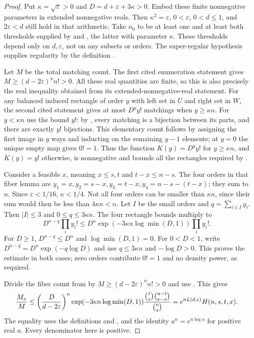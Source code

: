 \begin{proof}
Put $\kappa=\sqrt\varepsilon>0$ and $D=d+\varepsilon+3\kappa>0$.
Embed these finite nonnegative parameters in extended nonnegative reals.
Then $\kappa^2=\varepsilon$, $0<\varepsilon$, $0<d\le1$, and
$2\varepsilon<d$ still hold in that arithmetic.
Take $n_0$ to be at least one and at least both thresholds supplied by
 and
, the latter with parameter
$\kappa$. These thresholds depend only on $d,\varepsilon$, not on any
subsets or orders. The super-regular hypothesis supplies regularity by
the definition .

Let $M$ be the total matching count. The first cited enumeration statement
gives $M\ge(d-2\varepsilon)^n n!>0$. All these real quantities are finite,
so this is also precisely the real inequality obtained from its
extended-nonnegative-real statement. For any balanced induced rectangle
of order $y$ with left set in $U$ and right set in $W$, the second cited
statement gives at most $D^y y!$ matchings when $y\ge\kappa n$.
For $y<\kappa n$ use the bound $y!$: by
, every matching is a bijection between its
parts, and there are exactly $y!$ bijections. This elementary count
follows by assigning the first image in $y$ ways and inducting on the
remaining $y-1$ elements; at $y=0$ the unique empty map gives $0!=1$.
Thus the function $K(y)=D^y y!$ for $y\ge\kappa n$, and $K(y)=y!$
otherwise, is nonnegative and bounds all the rectangles required by
.

Consider a feasible $x$, meaning $x\le s,t$ and $t-x\le n-s$.
The four orders in that fiber lemma are
$y_1=x,y_2=s-x,y_3=t-x,y_4=n-s-(t-x)$; they sum to $n$.
Since $\varepsilon<1/16$, $\kappa<1/4$.
Not all four orders can be smaller than $\kappa n$, since their sum
would then be less than $4\kappa n<n$. Let $I$ be the small orders and
$q=\sum_{i\in I}y_i$. Then $|I|\le3$ and $0\le q\le3\kappa n$.
The four rectangle bounds multiply to
\[
 D^{n-q}\prod_i y_i!
 \le D^n\exp(-3\kappa n\log\min(D,1))\prod_i y_i!.
\]
For $D\ge1$, $D^{n-q}\le D^n$ and $\log\min(D,1)=0$.
For $0<D<1$, write $D^{n-q}=D^n\exp(-q\log D)$ and use
$q\le3\kappa n$ and $-\log D>0$. This proves the estimate in both
cases; zero orders contribute $0!=1$ and no density power, as required.

Divide the fiber count from 
by $M\ge(d-2\varepsilon)^n n!>0$ and use
. This gives
\[
 {M_x\over M}\le
 \left({D\over d-2\varepsilon}\right)^n
 \exp(-3\kappa n\log\min(D,1))
 {\binom t x\binom{n-t}{s-x}\over\binom n s}
 =e^{nL(d,\varepsilon)}H(n,s,t,x).
\]
The equality uses the definitions
 and
, and the identity $a^n=e^{n\log a}$
for positive real $a$. Every denominator here is positive.


\end{proof}
